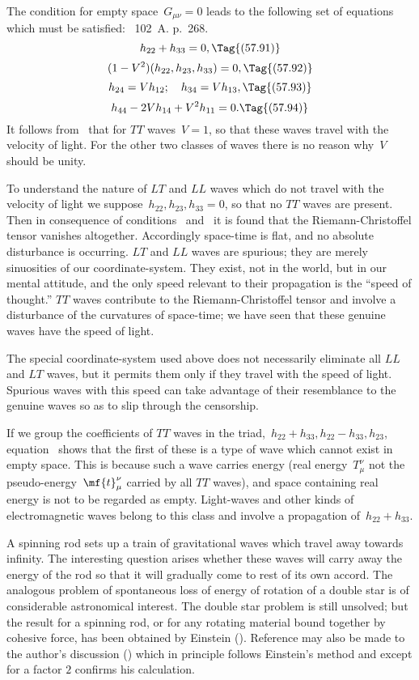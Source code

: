 \documentclass[12pt]{book}
\begin{document}
The condition for empty space~$G_{\mu\nu} = 0$ leads to the following set of equations which must be
satisfied\footnotemark:\footnotetext
      {\ 102~A. p.~268.}
\[
h_{22} + h_{33} = 0,\Tag{(57.91)}
\]
\[
(1-V^2)(h_{22}, h_{23}, h_{33}) = 0,\Tag{(57.92)}
\]
\[
h_{24} = V h_{12}; \quad h_{34} = V h_{13},\Tag{(57.93)}
\]
\[
h_{44} - 2 V h_{14} + V^2 h_{11} = 0.\Tag{(57.94)}
\]
It follows from~ that for $TT$ waves~$V=1$, so that these waves travel with the velocity of light.
For the other two classes of waves there is no reason why~$V$ should be unity.

To understand the nature of $LT$ and $LL$ waves which do not travel with the velocity of light we
suppose~$h_{22}, h_{23}, h_{33} = 0$, so that no $TT$ waves are present.
Then in consequence of conditions~ and~ it is found that the Riemann\hyp{}Christoffel
tensor vanishes altogether.
Accordingly space-time is flat, and no absolute disturbance is occurring.
$LT$ and $LL$ waves are spurious;
they are merely sinuosities of our coordinate\hyp{}system.
They exist, not in the world, but in our mental attitude, and the only speed relevant to their propagation is
the ``speed of thought.'' $TT$ waves contribute to the Riemann\hyp{}Christoffel tensor and involve a disturbance of the
curvatures of space-time; we have seen that these genuine waves have the speed of light.

The special coordinate\hyp{}system used above does not necessarily eliminate all $LL$ and $LT$ waves,
but it permits them only if they travel with the speed of light.
Spurious waves with this speed can take advantage of their resemblance to the genuine waves so as to slip
through the censorship.

If we group the coefficients of $TT$ waves in the triad,~$h_{22}+h_{33},h_{22}-h_{33},h_{23}$, equation~
shows that the first of these is a type of wave which cannot exist in empty space.
This is because such a wave carries energy (real energy~$T^\nu_\mu$ not the pseudo\hyp{}energy~$\mf{t}^\nu_\mu$
carried by all $TT$ waves), and space containing real energy is not to be regarded as empty.
Light-waves and other kinds of electromagnetic waves belong to this class and involve
a propagation of~$h_{22}+h_{33}$.

A spinning rod sets up a train of gravitational waves which travel away towards infinity.
The interesting question arises whether these waves will carry away the energy of the rod so that it will
gradually come to rest of its own accord.
The analogous problem of spontaneous loss of energy of rotation of a double star is of considerable
astronomical interest.
The double star problem is still unsolved; but the result for a spinning rod, or for any rotating material
bound together by cohesive force, has been obtained by Einstein
().
Reference may also be made to the author's discussion
() which in principle follows Einstein's method and except for a factor $2$
confirms his calculation.
\end{document}
